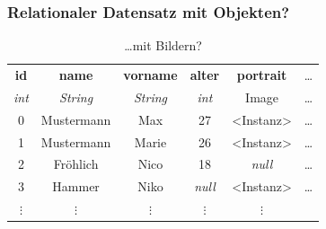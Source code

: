 \begin{frame}
    \frametitle{Relationaler Datensatz mit Objekten?}

    \begin{table}
        \centering
        \begin{adjustbox}{width=\textwidth}
            \small
            \begin{tabular}[c]{|c|c|c|c|c|c}

                \hline

                \multicolumn{1}{|c|}{\textbf{id}} &
                \multicolumn{1}{c|}{\textbf{name}} &
                \multicolumn{1}{c|}{\textbf{vorname}} &
                \multicolumn{1}{c|}{\textbf{alter}} &
                \multicolumn{1}{c|}{\textbf{portrait}} &
                \multicolumn{1}{c}{\dots} \\

                \multicolumn{1}{|c|}{\textit{int}} &
                \multicolumn{1}{c|}{\textit{String}} &
                \multicolumn{1}{c|}{\textit{String}} &
                \multicolumn{1}{c|}{\textit{int}} &
                \multicolumn{1}{c|}{\alert{Image}} &
                \multicolumn{1}{c}{\dots} \\

                \hline

                0  & Mustermann  & Max    & 27             & \alert{<Instanz>}      & \dots \\
                1  & Mustermann  & Marie  & 26             & \alert{<Instanz>}      & \dots \\
                2  & Fröhlich    & Nico   & 18             & \textit{null}  & \dots \\
                3  & Hammer      & Niko   & \textit{null}  & \alert{<Instanz>}     & \dots \\
                $\vdots$ & $\vdots$ & $\vdots$ & $\vdots$ & $\vdots$ &

            \end{tabular}
        \end{adjustbox}
        \caption{\dots mit Bildern?}
        \label{tab:erwachsene3}
    \end{table}

\end{frame}
